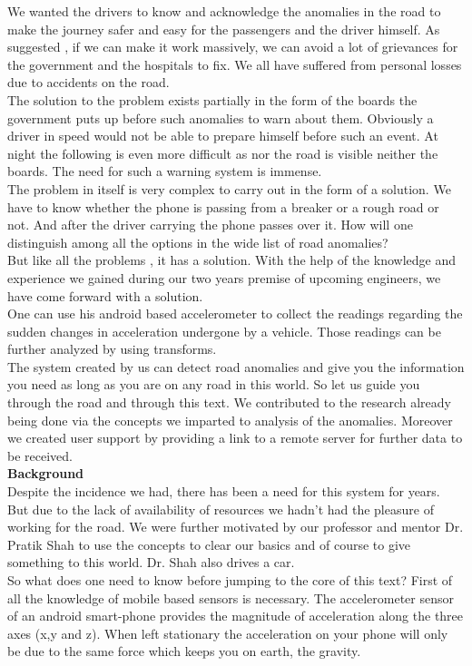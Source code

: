 \documentclass[12pt]{report}
\begin{document}
We wanted the drivers to know and acknowledge the anomalies in the road to make the journey safer and easy for the passengers and the driver himself.
As suggested , if we can make it work massively, we can avoid a lot of grievances for the government and the hospitals to fix. We all have suffered from personal losses due to accidents on the road.\\
The solution to the problem exists partially in the form of the boards the government puts up before such anomalies to warn about them. Obviously a driver in speed would not be able to prepare himself before such an event. At night the following is even more difficult as nor the road is visible neither the boards. The need for such a warning system is immense.\\
The problem in itself is very complex to carry out in the form of a solution. We have to know whether the phone is passing from a breaker or a rough road or not. And after the driver carrying the phone passes over it. How will one distinguish among all the options in the wide list of road anomalies?\\
But like all the problems , it has a solution. With the help of the knowledge and experience we gained during our two years premise of upcoming engineers, we have come forward with a solution.\\
One can use his android based accelerometer to collect the readings regarding the sudden changes in acceleration undergone by a vehicle. Those readings can be further analyzed by using transforms.\\
The system created by us can detect road anomalies and give you the information you need as long as you are on any road in this world.
So let us guide you through the road and through this text. We contributed to the research already being done via the concepts we imparted to analysis of the anomalies. Moreover we created user support by providing a link to a remote server for further data to be received.\\
\textbf{Background}\\
Despite the incidence we had, there has been a need for this system for years. But due to the lack of availability of resources we hadn't had the pleasure of working for the road. We were further motivated by our professor and mentor Dr. Pratik Shah to use the concepts to clear our basics and of course to give something to this world. Dr. Shah also drives a car.\\
So what does one need to know before jumping to the core of this text? First of all the knowledge of mobile based sensors is necessary. The accelerometer sensor of an android smart-phone provides the magnitude of acceleration along the three axes (x,y and z). When left stationary the acceleration on your phone will only be due to the same force which keeps you on earth, the gravity.\\
\end{document}
